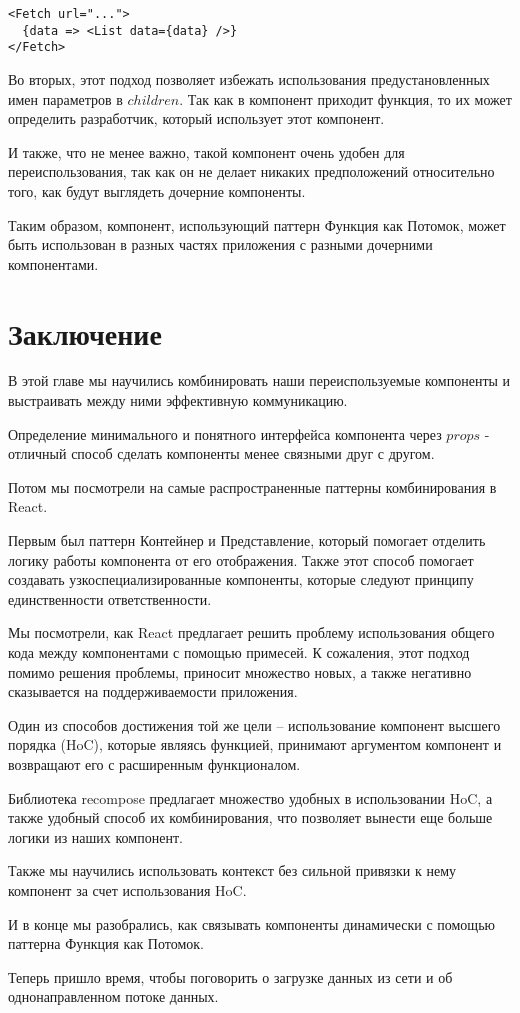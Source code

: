 \begin{lstlisting}
<Fetch url="...">
  {data => <List data={data} />}
</Fetch>
\end{lstlisting}

Во вторых, этот подход позволяет избежать использования предустановленных имен параметров в $children$. Так как в компонент приходит функция, то их может определить разработчик, который использует этот компонент.

И также, что не менее важно, такой компонент очень удобен для переиспользования, так как он не делает никаких предположений относительно того, как будут выглядеть дочерние компоненты.

Таким образом, компонент, использующий паттерн Функция как Потомок, может быть использован в разных частях приложения с разными дочерними компонентами.

\section{Заключение}

В этой главе мы научились комбинировать наши переиспользуемые компоненты и выстраивать между ними эффективную коммуникацию.

Определение минимального и понятного интерфейса компонента через $props$ - отличный способ сделать компоненты менее связными друг с другом.

Потом мы посмотрели на самые распространенные паттерны комбинирования в React.

Первым был паттерн Контейнер и Представление, который помогает отделить логику работы компонента от его отображения. Также этот способ помогает создавать узкоспециализированные компоненты, которые следуют принципу единственности ответственности.

Мы посмотрели, как React предлагает решить проблему использования общего кода между компонентами с помощью примесей. К сожаления, этот подход помимо решения проблемы, приносит множество новых, а также негативно сказывается на поддерживаемости приложения.

Один из способов достижения той же цели -- использование компонент высшего порядка (HoC), которые являясь функцией, принимают аргументом компонент и возвращают его с расширенным функционалом.

Библиотека recompose предлагает множество удобных в использовании HoC, а также удобный способ их комбинирования, что позволяет вынести еще больше логики из наших компонент.

Также мы научились использовать контекст без сильной привязки к нему компонент за счет использования HoC.

И в конце мы разобрались, как связывать компоненты динамически с помощью паттерна Функция как Потомок.

Теперь пришло время, чтобы поговорить о загрузке данных из сети и об однонаправленном потоке данных. 

















